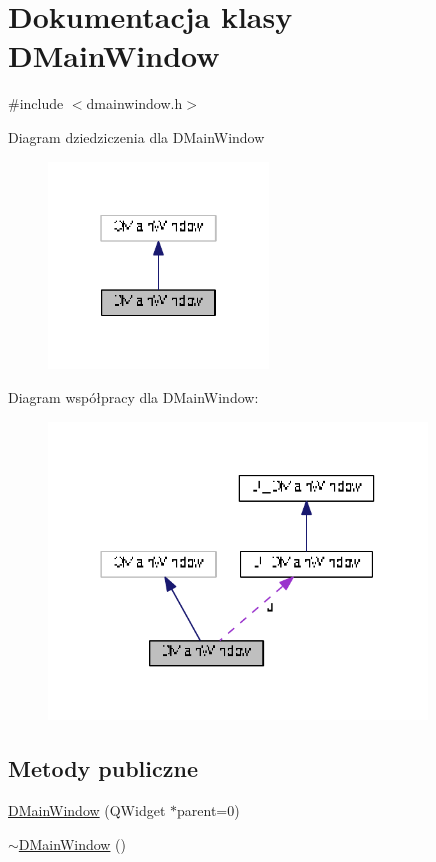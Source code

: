 \hypertarget{class_d_main_window}{}\section{Dokumentacja klasy D\+Main\+Window}
\label{class_d_main_window}


{\ttfamily \#include $<$dmainwindow.\+h$>$}



Diagram dziedziczenia dla D\+Main\+Window
\nopagebreak
\begin{figure}[H]
\begin{center}
\leavevmode
\includegraphics[width=166pt]{class_d_main_window__inherit__graph}
\end{center}
\end{figure}


Diagram współpracy dla D\+Main\+Window\+:
\nopagebreak
\begin{figure}[H]
\begin{center}
\leavevmode
\includegraphics[width=285pt]{class_d_main_window__coll__graph}
\end{center}
\end{figure}
\subsection*{Metody publiczne}
\begin{DoxyCompactItemize}
\item 
\hyperlink{class_d_main_window_a5eb52e50cb0f15345279e161eed68389}{D\+Main\+Window} (Q\+Widget $\ast$parent=0)
\item 
\hyperlink{class_d_main_window_acca34964f553e9e18371434ad8dc171c}{$\sim$\+D\+Main\+Window} ()
\end{DoxyCompactItemize}
